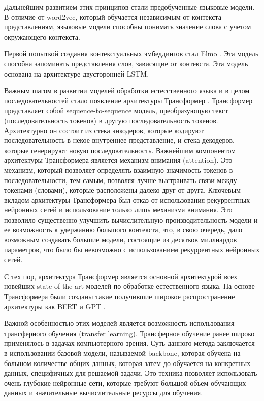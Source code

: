 Дальнейшим развитием этих принципов стали предобученные языковые модели. В отличие от word2vec, который обучается независимым от контекста представлениям, языковые модели способны понимать значение слова с учетом окружающего контекста.

Первой попыткой создания контекстуальных эмбеддингов стал Elmo \cite{elmo}. Эта модель способна запоминать представления слов, зависящие от контекста. Эта модель основана на архитектуре двусторонней LSTM.

Важным шагом в развитии моделей обработки естесственного языка и в целом последовательностей стало появление архитектуры Трансформер \cite{transformer}. Трансформер представляет собой sequence-to-sequence модель, преобразующую текст (последовательность токенов) в другую последовательность токенов. Архитектурно он состоит из стека энкодеров, которые кодируют последовательность в некое внутреннее представление, и стека декодеров, которые генерируют новую последовательность. Важнейшим компонентом архитектуры Трансформера является механизм внимания (attention). Это механизм, который позволяет определять взаимную значимость токенов в последовательности, тем самым, позволяя лучше выстраивать связи между токенами (словами), которые расположены далеко друг от друга. Ключевым вкладом архитектуры Трансформера был отказ от использования рекуррентных нейронных сетей и использование только лишь механизма внимания. Это позволило существенно улучшить вычислительную производительность модели и ее возможность к удержанию большого контекста, что, в свою очередь, дало возможным создавать большие модели, состоящие из десятков миллиардов параметров, что было бы невозможно с использованием рекуррентных нейронных сетей.

С тех пор, архитектура Трансформер является основной архитектурой всех новейших state-of-the-art моделей по обработке естественного языка. На основе Трансформера были созданы такие получившие широкое распространение архитектуры как BERT \cite{bert} и GPT \cite{gpt}.

Важной особенностью этих моделей является возможность использования трансферного обучения (transfer learning). Трансферное обучение ранее широко применялось в задачах компьютерного зрения. Суть данного метода заключается в использовании базовой модели, называемой backbone, которая обучена на большом количестве общих данных, которая затем до-обучается на конкретных данных, специфичных для решаемой задачи. Это техника позволяет использовать очень глубокие нейронные сети, которые требуют большой объем обучающих данных и значительные вычислительные ресурсы для обучения.

